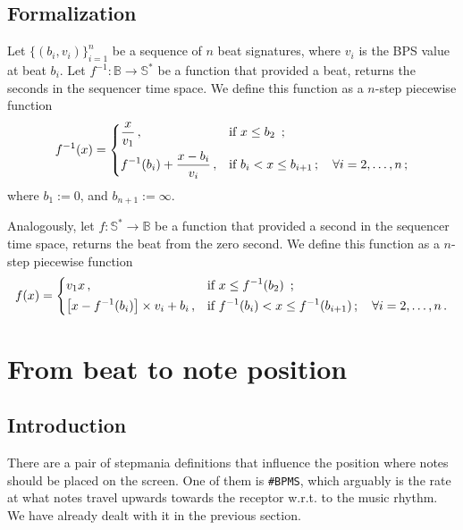 \documentclass[a4paper,9pt]{article}
\begin{document}
\subsection{Formalization}
Let $\{\left( b_i, v_i \right)\}_{i=1}^{n}$ be a sequence of $n$ beat signatures, where $v_i$ is the BPS  value at beat $b_i$. 
Let $ f^{-1}: \mathbb{B} \rightarrow \mathbb{S^{*}} $ be a function that provided a beat, returns the seconds in the sequencer time space. We define this function as a $n$-step piecewise function
    \begin{equation}
	    f^{-1}(x) = \begin{dcases}
		    \frac{x}{v_1}\,, & \text{if $x \leq b_{2} $ }\,;\\
		    f^{-1}(b_{i}) + \frac{x-b_{i}}{v_i}\,, & \text{if $b_{i} < x \leq b_{i+1}\,; \quad \forall i=2,\ldots,n $}\,; \\
	    \end{dcases}
	    \label{eq:beat2second}
    \end{equation}
    where $ b_1 := 0$,  and $b_{n+1} := \infty$.
    
    Analogously, let $ f: \mathbb{S^{*}} \rightarrow \mathbb{B} $ be a function that provided a second in the sequencer time space, returns the beat from the zero second. We define this function as a $n$-step piecewise function
    \begin{equation}
	    f(x) = \begin{dcases}
		    v_1x\,, & \text{if $x \leq f^{-1}(b_{2}) $ }\,;\\
		    \left[x-f^{-1}(b_{i})\right]\times v_i + b_{i}\,, & \text{if $f^{-1}(b_{i}) < x \leq f^{-1}(b_{i+1})\,;\quad \forall i=2,\ldots,n$}\,. \\
	    \end{dcases}
	    \label{eq:beat2second}
    \end{equation}

    \section{From beat to note position}\label{sec:beat2noteposition}

    \subsection{Introduction}

    There are a pair of stepmania definitions that influence the position where notes should be placed on the screen. One of them is \texttt{\#BPMS}, which arguably is the rate at what notes travel upwards towards the receptor w.r.t. to the music rhythm. We have already dealt with it in the previous section. 
\end{document}
